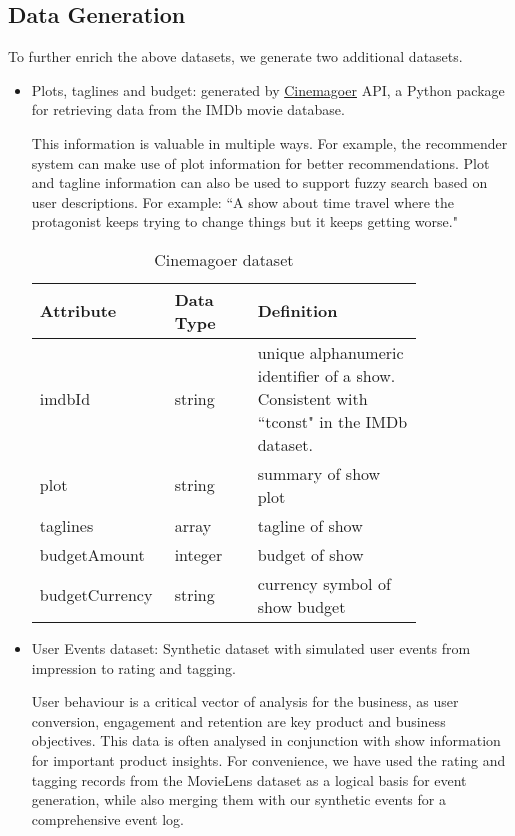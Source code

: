 \documentclass[10pt,titlepage]{article}
\begin{document}
\subsection{Data Generation}
To further enrich the above datasets, we generate two additional datasets.

\begin{itemize}
    \item Plots, taglines and budget: generated by \href{https://cinemagoer.github.io/}{Cinemagoer} API, a Python package
        for retrieving data from the IMDb movie database.

        This information is valuable in multiple ways. For example, the recommender system can make use of plot information for better recommendations. Plot and tagline information can also be used to support fuzzy search based on user descriptions. For example: ``A show about time
        travel where the protagonist keeps trying to change things but it keeps getting worse."

        \begin{table}[H]
            \centering
            \begin{tabular}{p{0.2\linewidth} | p{0.2\linewidth} | p{0.4\linewidth}}
                \hline
                \textbf{Attribute} & \textbf{Data Type}  & \textbf{Definition}\\
                \hline
                imdbId & string & unique alphanumeric identifier of a show. Consistent with ``tconst" in the IMDb dataset. \\
                \hline
                plot & string & summary of show plot \\
                \hline
                taglines & array & tagline of show \\
                \hline
                budgetAmount & integer & budget of show \\
                \hline
                budgetCurrency & string & currency symbol of show budget \\
                \hline
            \end{tabular}
            \caption{Cinemagoer dataset}
            \label{tab:cinemagoer}
        \end{table}

    \item User Events dataset: Synthetic dataset with simulated user events from impression to rating and tagging.

        User behaviour is a critical vector of analysis for the business, as user conversion, engagement and retention
        are key product and business objectives. This data is often analysed in conjunction with show information for
        important product insights. For convenience, we have used the rating and tagging records from the MovieLens
        dataset as a logical basis for event generation, while also merging them with our synthetic events for a
        comprehensive event log.


\end{itemize}
\end{document}
